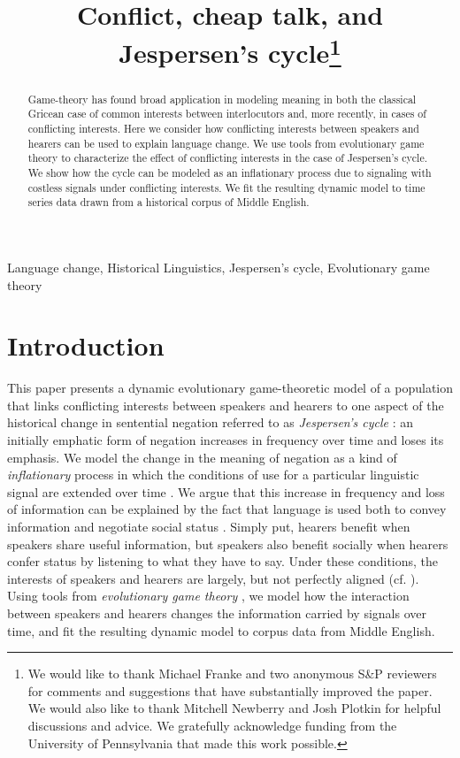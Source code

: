 \documentclass[linguex]{sp}
\title[Conflict, cheap talk, and Jespersen's cycle]{Conflict, cheap talk, and Jespersen's cycle\thanks{We would like to thank Michael Franke and two anonymous S\&P reviewers for comments and suggestions that have substantially improved the paper. We would also like to thank Mitchell Newberry and Josh Plotkin for helpful discussions and advice. We gratefully acknowledge funding from the University of Pennsylvania that made this work possible.}}
\author[Ahern \& Clark]{ 
  \spauthor{Christopher Ahern \\ \institute{Department of Linguistics,\\ University of Pennsylvania}} \AND
  \spauthor{Robin Clark \\ \institute{Department of Linguistics,\\ University of Pennsylvania}}
}
\theoremstyle{definition} \newtheorem{definition}{Definition}
\begin{document}
\maketitle

\begin{abstract}
Game-theory has found broad application in modeling meaning in both the classical Gricean case of common interests between interlocutors and, more recently, in cases of conflicting interests. Here we consider how conflicting interests between speakers and hearers can be used to explain language change. We use tools from  evolutionary game theory to characterize the effect of conflicting interests in the case of Jespersen's cycle.  We show how the cycle can be modeled as an inflationary process due to signaling with costless signals under conflicting interests. We fit the resulting dynamic model to time series data drawn from a historical corpus of Middle English.
\end{abstract}

\begin{keywords}
	 Language change, Historical Linguistics, Jespersen's cycle, Evolutionary game theory
\end{keywords}


\section{Introduction}
\label{Introduction}


This paper presents a dynamic evolutionary game-theoretic model of a population that links conflicting interests between speakers and hearers to one aspect of the historical change in sentential negation referred to as \emph{Jespersen's cycle} \citeyearpar{jespersen:1917}: an initially emphatic form of negation increases in frequency over time and  loses its emphasis. We model the change in the meaning of negation as a kind of \emph{inflationary} process in which the conditions of use for a particular linguistic signal are extended over time \citep{dahl:2001}. We argue that this increase in frequency and loss of information can be explained by the fact that language is used both to convey information and negotiate social status \citep{dessalles2007,franke-etal:2012}. Simply put, hearers benefit when speakers share useful information, but  speakers also benefit socially when hearers confer status by listening to what they have to say. Under these conditions, the interests of speakers and hearers are largely, but not perfectly aligned (cf. \citealt{benz-jager-van-rooij:2006, franke-etal:2012, de-jaegher-van-rooij:2014, asher2013strategic}). Using tools from \emph{evolutionary game theory} \citep{maynard-smith1982, hofbauer-sigmund1998}, we model how the interaction between speakers and hearers changes the information carried by signals over time, and fit the resulting dynamic model to corpus data from Middle English.
\end{document}
